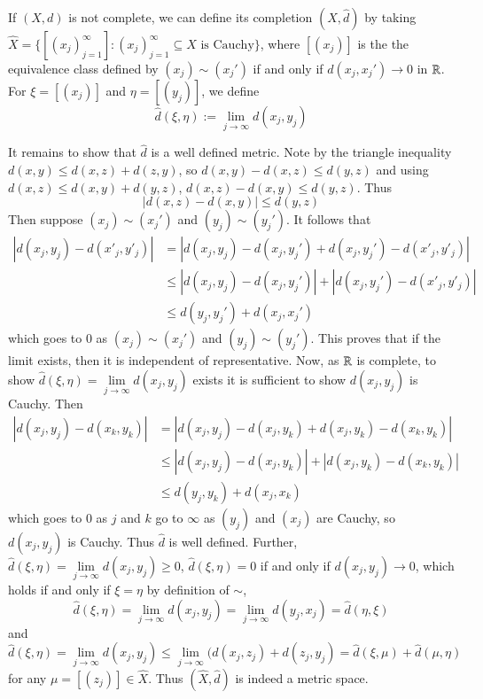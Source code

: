 \begin{defn}
    If $(X,d)$ is not complete, we can define its completion $(\hat{X},\hat{d})$ by taking $\hat{X} = \{[(x_j)_{j=1}^{\infty}] : (x_j)_{j=1}^{\infty}\subseteq X\text{ is Cauchy}\}$, where $[(x_j)]$ is the the equivalence class defined by $(x_j) \sim (x_j')$ if and only if $d(x_j,x_j') \rightarrow 0$ in $\mathbb R$. For $\xi = [(x_j)]$ and $\eta = [(y_j)]$, we define \begin{equation*}
        \hat{d}(\xi,\eta) := \lim\limits_{j\rightarrow \infty}d(x_j,y_j)
    \end{equation*}
\end{defn}
It remains to show that $\hat{d}$ is a well defined metric. Note by the triangle inequality $d(x,y) \leq d(x,z) + d(z,y)$, so $d(x,y) - d(x,z) \leq d(y,z)$ and using $d(x,z) \leq d(x,y) + d(y,z)$, $d(x,z) - d(x,y) \leq d(y,z)$. Thus $$|d(x,z) - d(x,y)| \leq d(y,z)$$ Then suppose $(x_j) \sim (x_j')$ and $(y_j) \sim (y_j')$. It follows that \begin{align*}
    |d(x_j,y_j) - d(x'_j,y'_j)| &= |d(x_j,y_j) - d(x_j,y_j') + d(x_j,y_j') - d(x'_j,y'_j)| \\
    &\leq |d(x_j,y_j) - d(x_j,y_j')| + |d(x_j,y_j') - d(x'_j,y'_j)| \\
    &\leq d(y_j,y_j') + d(x_j,x_j')
\end{align*}
which goes to $0$ as $(x_j)\sim(x_j')$ and $(y_j)\sim(y_j')$. This proves that if the limit exists, then it is independent of representative. Now, as $\mathbb R$ is complete, to show $\hat{d}(\xi,\eta) = \lim\limits_{j\rightarrow \infty}d(x_j,y_j)$ exists it is sufficient to show $d(x_j,y_j)$ is Cauchy. Then \begin{align*}
    |d(x_j,y_j) - d(x_k,y_k)| &= |d(x_j,y_j) - d(x_j,y_k) + d(x_j,y_k) - d(x_k,y_k)| \\
    &\leq |d(x_j,y_j) - d(x_j,y_k)| + |d(x_j,y_k) - d(x_k,y_k)| \\
    &\leq d(y_j,y_k) + d(x_j,x_k)
\end{align*}
which goes to $0$ as $j$ and $k$ go to $\infty$ as $(y_j)$ and $(x_j)$ are Cauchy, so $d(x_j,y_j)$ is Cauchy. Thus $\hat{d}$ is well defined. Further, $\hat{d}(\xi,\eta) = \lim\limits_{j\rightarrow \infty}d(x_j,y_j) \geq 0$, $\hat{d}(\xi,\eta) = 0$ if and only if $d(x_j,y_j)\rightarrow 0$, which holds if and only if $\xi = \eta$ by definition of $\sim$, $$\hat{d}(\xi,\eta) = \lim\limits_{j\rightarrow \infty}d(x_j,y_j) = \lim\limits_{j\rightarrow \infty}d(y_j,x_j) = \hat{d}(\eta,\xi)$$
and \begin{equation*}
    \hat{d}(\xi,\eta) = \lim\limits_{j\rightarrow \infty}d(x_j,y_j) \leq \lim\limits_{j\rightarrow \infty}(d(x_j,z_j) + d(z_j,y_j) = \hat{d}(\xi,\mu) + \hat{d}(\mu,\eta)
\end{equation*}
for any $\mu = [(z_j)] \in \hat{X}$. Thus $(\hat{X},\hat{d})$ is indeed a metric space.

